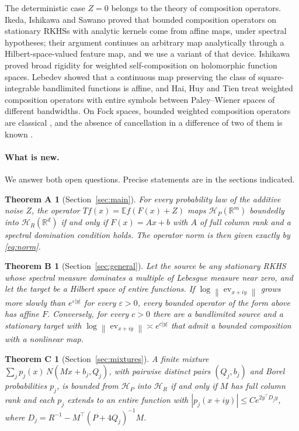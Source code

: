 \documentclass[11pt,a4paper]{article}
\newtheorem*{theoremA}{Theorem A}
\newtheorem*{theoremB}{Theorem B}
\newtheorem*{theoremC}{Theorem C}
\theoremstyle{remark}
\newcommand{\R}{\mathbb R}
\newcommand{\E}{\mathbb E}
\newcommand{\HH}{\mathcal H}
\newcommand{\norm}[1]{\left\lVert#1\right\rVert}
\begin{document}
The deterministic case $Z=0$ belongs to the theory of composition
operators. Ikeda, Ishikawa and Sawano \cite{Ikeda2022} proved that
bounded composition operators on stationary RKHSs with analytic kernels
come from affine maps, under spectral hypotheses; their argument
continues an arbitrary map analytically through a Hilbert-space-valued
feature map, and we use a variant of that device. Ishikawa
\cite{Ishikawa2026} proved broad rigidity for weighted self-composition
on holomorphic function spaces. Lebedev \cite{Lebedev2012} showed that a
continuous map preserving the class of square-integrable bandlimited
functions is affine, and Hai, Huy and Tien \cite{HaiHuyTien2026} treat
weighted composition operators with entire symbols between Paley--Wiener
spaces of different bandwidths. On Fock spaces, bounded weighted
composition operators are classical \cite{TienKhoiFock2019,TienKhoi2020},
and the absence of cancellation in a difference of two of them is known
\cite[Theorem~1.4]{TienKhoi2019}.

\paragraph{What is new.}
We answer both open questions. Precise statements are in the sections
indicated.

\begin{theoremA}[Section~\ref{sec:main}]
For every probability law of the additive noise $Z$, the operator
$Tf(x)=\E f(F(x)+Z)$ maps $\HH_P(\R^m)$ boundedly into $\HH_R(\R^d)$ if
and only if $F(x)=Ax+b$ with $A$ of full column rank and a spectral
domination condition holds. The operator norm is then given exactly by
\eqref{eq:norm}.
\end{theoremA}

\begin{theoremB}[Section~\ref{sec:general}]
Let the source be any stationary RKHS whose spectral measure dominates a
multiple of Lebesgue measure near zero, and let the target be a Hilbert
space of entire functions. If $\log\norm{\operatorname{ev}_{x+iy}}$ grows
more slowly than $e^{\varepsilon|y|}$ for every $\varepsilon>0$, every
bounded operator of the form above has affine $F$. Conversely, for every
$c>0$ there are a bandlimited source and a stationary target with
$\log\norm{\operatorname{ev}_{x+iy}}\asymp e^{c|y|}$ that admit a
bounded composition with a nonlinear map.
\end{theoremB}

\begin{theoremC}[Section~\ref{sec:mixtures}]
A finite mixture $\sum_jp_j(x)\,N(Mx+b_j,Q_j)$, with pairwise
distinct pairs $(Q_j,b_j)$ and Borel probabilities $p_j$, is bounded from $\HH_P$ into $\HH_R$ if and only if $M$ has full
column rank and each $p_j$ extends to an entire function with
$|p_j(x+iy)|\le Ce^{2y^\top D_jy}$, where
$D_j=R^{-1}-M^\top(P+4Q_j)^{-1}M$.
\end{theoremC}
\end{document}
